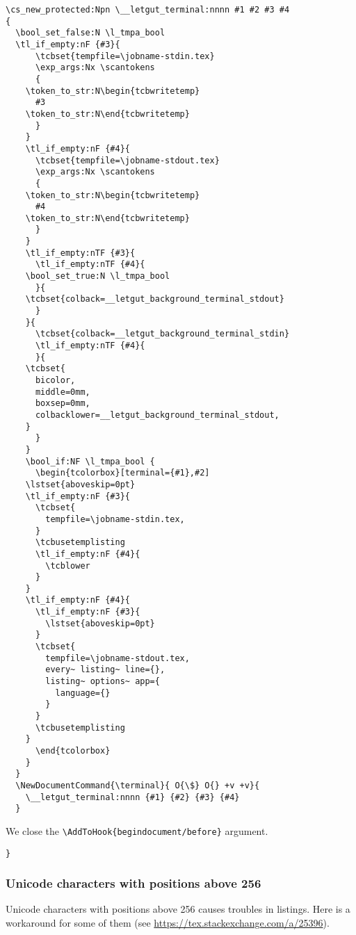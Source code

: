 \documentclass{letgut}
\begin{document}
\begin{lstlisting}
\cs_new_protected:Npn \__letgut_terminal:nnnn #1 #2 #3 #4
{
  \bool_set_false:N \l_tmpa_bool
  \tl_if_empty:nF {#3}{
      \tcbset{tempfile=\jobname-stdin.tex}
      \exp_args:Nx \scantokens
      {
	\token_to_str:N\begin{tcbwritetemp}
	  #3
	\token_to_str:N\end{tcbwritetemp}
      }
    }
    \tl_if_empty:nF {#4}{
      \tcbset{tempfile=\jobname-stdout.tex}
      \exp_args:Nx \scantokens
      {
	\token_to_str:N\begin{tcbwritetemp}
	  #4
	\token_to_str:N\end{tcbwritetemp}
      }
    }
    \tl_if_empty:nTF {#3}{
      \tl_if_empty:nTF {#4}{
	\bool_set_true:N \l_tmpa_bool
      }{
	\tcbset{colback=__letgut_background_terminal_stdout}
      }
    }{
      \tcbset{colback=__letgut_background_terminal_stdin}
      \tl_if_empty:nTF {#4}{
      }{
	\tcbset{
	  bicolor,
	  middle=0mm,
	  boxsep=0mm,
	  colbacklower=__letgut_background_terminal_stdout,
	}
      }
    }
    \bool_if:NF \l_tmpa_bool {
      \begin{tcolorbox}[terminal={#1},#2]
	\lstset{aboveskip=0pt}
	\tl_if_empty:nF {#3}{
	  \tcbset{
	    tempfile=\jobname-stdin.tex,
	  }
	  \tcbusetemplisting
	  \tl_if_empty:nF {#4}{
	    \tcblower
	  }
	}
	\tl_if_empty:nF {#4}{
	  \tl_if_empty:nF {#3}{
	    \lstset{aboveskip=0pt}
	  }
	  \tcbset{
	    tempfile=\jobname-stdout.tex,
	    every~ listing~ line={},
	    listing~ options~ app={
	      language={}
	    }
	  }
	  \tcbusetemplisting
	}
      \end{tcolorbox}
    }
  }
  \NewDocumentCommand{\terminal}{ O{\$} O{} +v +v}{
    \__letgut_terminal:nnnn {#1} {#2} {#3} {#4}
  }
\end{lstlisting}

We close the \lstinline+\AddToHook{begindocument/before}+ argument.

\begin{lstlisting}
}
\end{lstlisting}

\subsubsection{Unicode characters with positions above 256}
\label{ImplementationListingsUnicodecharacterswithpositionsabove256-4l6h55h0jlj0}
Unicode characters with positions above 256 causes troubles in
listings. Here is a workaround for some of them (see
\url{https://tex.stackexchange.com/a/25396}).
\end{document}
